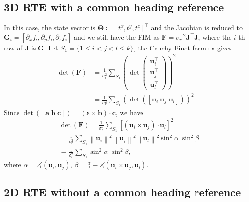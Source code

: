 \documentclass[journal]{IEEEtran}
\newcommand{\norm}[1]{\left\lVert#1\right\rVert}
\def\StateVector{\mathbf{\Theta}}
\def\FIM{\mathbf{F}}
\begin{document}
\begin{appendices}
\subsection{3D RTE with a common heading reference} \label{app_subsec:3D_known_theta}
In this case, the state vector is $\StateVector \coloneqq [t^x, t^y, t^z]^\top$ and the Jacobian is reduced to $\mathbf{G}_i = [\partial_x f_i,\partial_y f_i,\partial_z f_i]$ and we still have the FIM as $\FIM = \sigma_r^{-2} {\mathbf{J}^\top} {\mathbf{J}}$, where the $i$-th row of ${\mathbf{J}}$ is $\mathbf{G}$. Let ${S_1 = \{ 1 \leq i < j < l \leq k \}}$, the Cauchy-Binet formula gives
\begin{equation}
\begin{aligned}
    \det(\FIM) &= \frac{1}{\sigma_r^2} \sum\limits_{S_1}^{}
    \left(\det \left(
    \begin{matrix}
        \mathbf{u}_i^\top \\[0.2em]
        \mathbf{u}_j^\top \\[0.2em]
        \mathbf{u}_l^\top 
    \end{matrix}
    \right) \right)^2 \\
    &= \frac{1}{\sigma_r^2} \sum\limits_{S_1}^{}
    \left(\det \left(
    [\mathbf{u}_i \; \mathbf{u}_j \; \mathbf{u}_l] \right) \right)^2.
\end{aligned}
\end{equation}
Since ${\det([\mathbf{a} \; \mathbf{b} \; \mathbf{c}]) = (\mathbf{a} \times \mathbf{b}) \cdot \mathbf{c}}$, we have
\begin{equation}
\begin{aligned}
    &\det(\FIM) = \frac{1}{\sigma_r^2} \sum\limits_{S_1}^{}
    \left[
    (\mathbf{u}_i \times \mathbf{u}_j) \cdot \mathbf{u}_l
    \right]^2 \\
    &= \frac{1}{\sigma_r^2} \sum\limits_{S_1}^{}
    \norm{\mathbf{u}_i}^2 
    \norm{\mathbf{u}_j}^2 
    \norm{\mathbf{u}_l}^2 
    \sin^2 \alpha \;
    \sin^2 \beta \\
    &= \frac{1}{\sigma_r^2} \sum\limits_{S_1}^{}
    \sin^2 \alpha \;
    \sin^2 \beta,
\end{aligned}
\end{equation}
where 
$\alpha = \measuredangle (\mathbf{u}_i, \mathbf{u}_j)$, 
$\beta = \frac{\pi}{2} - \measuredangle (\mathbf{u}_i \times \mathbf{u}_j, \mathbf{u}_l)$.


\subsection{2D RTE without a common heading reference} \label{subsec:2D_RTE_no_heading}


\end{appendices}
\end{document}
